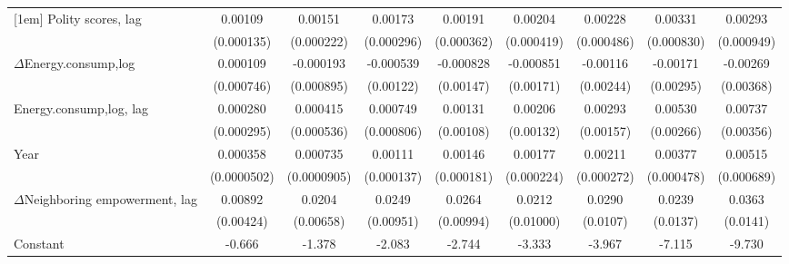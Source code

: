\begin{table}[htbp]
\begin{tabular}{l*{8}{c}}
[1em]
Polity scores, lag          &     0.00109\sym{***}&     0.00151\sym{***}&     0.00173\sym{***}&     0.00191\sym{***}&     0.00204\sym{***}&     0.00228\sym{***}&     0.00331\sym{***}&     0.00293\sym{***}\\
                    &  (0.000135)         &  (0.000222)         &  (0.000296)         &  (0.000362)         &  (0.000419)         &  (0.000486)         &  (0.000830)         &  (0.000949)         \\
[1em]
$\Delta$Energy.consump,log             &    0.000109         &   -0.000193         &   -0.000539         &   -0.000828         &   -0.000851         &    -0.00116         &    -0.00171         &    -0.00269         \\
                    &  (0.000746)         &  (0.000895)         &   (0.00122)         &   (0.00147)         &   (0.00171)         &   (0.00244)         &   (0.00295)         &   (0.00368)         \\
[1em]
Energy.consump,log, lag             &    0.000280         &    0.000415         &    0.000749         &     0.00131         &     0.00206         &     0.00293\sym{*}  &     0.00530\sym{**} &     0.00737\sym{**} \\
                    &  (0.000295)         &  (0.000536)         &  (0.000806)         &   (0.00108)         &   (0.00132)         &   (0.00157)         &   (0.00266)         &   (0.00356)         \\
[1em]
Year                &    0.000358\sym{***}&    0.000735\sym{***}&     0.00111\sym{***}&     0.00146\sym{***}&     0.00177\sym{***}&     0.00211\sym{***}&     0.00377\sym{***}&     0.00515\sym{***}\\
                    & (0.0000502)         & (0.0000905)         &  (0.000137)         &  (0.000181)         &  (0.000224)         &  (0.000272)         &  (0.000478)         &  (0.000689)         \\
[1em]
$\Delta$Neighboring  empowerment, lag &     0.00892\sym{**} &      0.0204\sym{***}&      0.0249\sym{***}&      0.0264\sym{***}&      0.0212\sym{**} &      0.0290\sym{***}&      0.0239\sym{*}  &      0.0363\sym{**} \\
                    &   (0.00424)         &   (0.00658)         &   (0.00951)         &   (0.00994)         &   (0.01000)         &    (0.0107)         &    (0.0137)         &    (0.0141)         \\
[1em]
Constant            &      -0.666\sym{***}&      -1.378\sym{***}&      -2.083\sym{***}&      -2.744\sym{***}&      -3.333\sym{***}&      -3.967\sym{***}&      -7.115\sym{***}&      -9.730\sym{***}\\

\end{tabular}
\end{table}
